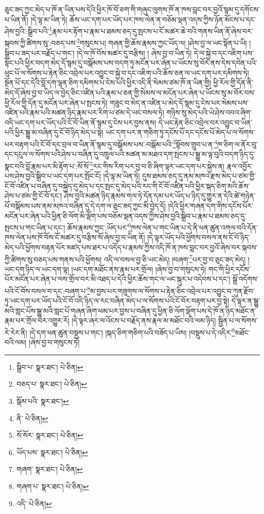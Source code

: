 ཅུང་ཟད་ཀྱང་མེད་པ་ཁོ་ན་ཡིན་པས་དེའི་ཕྱིར་ཁོ་བོ་ཅག་གི་གཞུང་ལུགས་ཁོ་ན་ཁས་བླང་བར་བྱའོ་སྙམ་དུ་དགོངས་པ་ཡིན་ནོ། །དེ་ལྟ་མ་ཡིན་ཏེ། ཆོས་ཡང་དག་པར་ཡོད་པར་ཁས་ལེན་ན་བཅོམ་ལྡན་འདས་ཀྱིས་ཉོན་མོངས་པ་དང་ཤེས་བྱའི་:སྒྲིབ་པའི་\footnote{སྒྲིབ་པ་  སྣར་ཐང་།  པེ་ཅིན། }རྣམ་པར་རྟོག་པ་རྣམ་པ་ཐམས་ཅད་དུ་སྤངས་པ་ངོ་མཚར་ཆེ་བའི་གནས་ཡིན་ནོ་ཞེས་བར་སྐབས་ཀྱི་ཚིགས་སུ་:བཅད་པས་\footnote{བཅད་པ་  སྣར་ཐང་།  པེ་ཅིན། }གསུངས་པ། གཞན་གྱི་ཆོས་རྣམས་ཀྱང་ཡོད་ལ། །ཤེས་བྱ་ལ་ཡང་སྟོན་པ་ཡི། །སྒྲིབ་པ་ཟད་པར་བརྗོད་པ་གང་། །དེ་ལ་ཁོ་བོས་མཚར་དུ་བརྩིས། །
ཞེས་བྱ་བ་ཡིན་ཏེ། དེ་ལ་སྐྱེ་བ་དང་འཇིག་པས་སྟོང་པའི་ཕྱིར་བདག་མེད་དོ་སྙམ་དུ་བསྒོམས་པས་བདག་ཏུ་མངོན་པར་ཞེན་པ་ཡོངས་སུ་བོར་ནས་དེས་དབེན་པའི་ཕུང་པོ་ལ་སོགས་པ་རྟེན་ཅིང་འབྲེལ་པར་འབྱུང་བ་སྐྱེ་བ་དང་འཇིག་པའི་ཆོས་ཅན་ལ་ཡང་དག་པར་དམིགས་ཏེ། སྔོན་པོ་དང་དེའི་བློ་དག་ལྷན་ཅིག་དམིགས་པ་ངེས་པའི་ཕྱིར་འདི་ནི་སེམས་ཙམ་ཁོ་ན་ཡིན་གྱི། ཕྱི་རོལ་གྱི་དོན་ནི་མེད་དོ་ཞེས་བྱ་བ་ཡིད་ལ་བྱེད་ཅིང་འཛིན་པའི་རྣམ་པ་ཅན་གྱི་སེམས་ལ་མངོན་པར་ཞེན་པ་ཡོངས་སུ་མ་བོར་བས་ཕྱི་རོལ་གྱི་དོན་དུ་མངོན་པར་ཞེན་པ་སྤངས་ཏེ། གཟུང་བ་མེད་ན་འཛིན་པ་མེད་དོ་སྙམ་དུ་ངེས་པར་སེམས་པས་འཛིན་པའི་རྣམ་པའི་མཚན་ཉིད་རྣམ་པར་རིག་པ་ཙམ་དེ་ཡང་བསལ་ཏེ། གཉིས་སུ་མེད་པའི་ཡེ་ཤེས་འབའ་ཞིག་འདི་ཡང་དག་པར་ཡོད་པའི་ངོ་བོ་ཡིན་ནོ་སྙམ་དུ་ངེས་པར་བྱས་ནས། དེ་ཡང་རྟེན་ཅིང་འབྲེལ་བར་འབྱུང་བ་ཡིན་པའི་ཕྱིར་སྒྱུ་མ་བཞིན་དུ་ངོ་བོ་ཉིད་མེད་པ་སྟེ། ཡང་དག་པར་ན་གཅིག་ཏུ་དངོས་པོ་དང་དངོས་པོ་མེད་པ་ལ་སོགས་པར་བརྟག་པའི་ངོ་བོ་དང་བྲལ་བ་ཡིན་ནོ་སྙམ་དུ་བསྒོམས་པས་:བསྒོམ་པའི་\footnote{སྒོམ་པའི་  སྣར་ཐང་། }སྟོབས་གྲུབ་པ་ན་\footnote{ནི་  པེ་ཅིན། }ཁ་ཅིག་ལ་ནོར་བུ་དང་དངུལ་ལ་སོགས་པའི་ཤེས་པ་བཞིན་དུ་འཁྲུལ་པའི་མཚན་མ་མཐའ་དག་སྤངས་པ་སྒྱུ་མ་ལྟ་བུའི་བདག་ཉིད་དུ་སྣང་བའི་བློ་རྣམ་པར་མི་རྟོག་པ་:སོ་སོ་\footnote{སོ་སོར་  སྣར་ཐང་།  པེ་ཅིན། }རང་གིས་རིག་པར་བྱ་བ་ཅི་ཞིག་ལྟར་ཡང་དག་པར་སྐྱེས་ན། རྣལ་འབྱོར་པས་ཤེས་བྱའི་སྒྲིབ་པ་ཡང་དག་པར་སྤོང་ངོ། །དེ་ལྟ་མ་ཡིན་ཏེ། དུས་ཐམས་ཅད་དུ་ནམ་མཁའ་རྫས་མེད་པ་ཙམ་གྱི་ངོ་བོ་འཛིན་པ་བཞིན་དུ་བསྐྱེད་དུ་མེད་པ་དང་སྤང་དུ་མེད་པའི་རང་གི་ངོ་བོ་འཛིན་པའི་ཕྱིར་སྐད་ཅིག་མའི་ཆོས་ཤེས་པ་ཙམ་གྱི་ངོ་བོ་དང་། ཤེས་བྱའི་མཚན་ཉིད་རྣམས་གལ་ཏེ་དོན་དམ་པར་ཡོད་པ་ཉིད་དུ་གྱུར་ན་དེའི་ཚེ་གཉེན་པོ་བསྒོམས་པས་ནམ་མཁའ་བཞིན་དུ་དེ་དག་ལ་ཅུང་ཟད་ཀྱང་མི་བྱེད་དོ། །དེའི་ཕྱིར་གཞན་དག་གིས་དངོས་པོར་མངོན་པར་ཞེན་པའི་ཕྱིན་ཅི་ལོག་མི་ལྡོག་པས་བཅོམ་ལྡན་འདས་ཀྱིས་ཤེས་བྱའི་སྒྲིབ་པ་རྣམ་པ་ཐམས་ཅད་དུ་སྤངས་པ་གང་ཡིན་པ་དང་། ཆོས་རྣམས་ཀྱང་:ཡོད་པར་\footnote{ཡོད་པས་  སྣར་ཐང་།  པེ་ཅིན། }ཁས་ལེན་པ་གང་ཡིན་པ་དེ་ནི་ཕན་ཚུན་འགལ་བའི་དོན་ཁས་ལེན་པས་ཁོ་བོས་ངོ་མཚར་དུ་བརྩིས་སོ་ཞེས་བྱ་བ་ཡིན་ནོ། །དེ་ལྟར་ཡོད་པའི་ཕྱོགས་བསལ་ནས་ངོ་བོ་ཉིད་མེད་པའི་ཕྱོགས་བརྟན་པོར་མཛད་པས་ཐར་པ་འདོད་པ་རྣམས་ཀྱིས་འདི་ཁོ་ན་ཁས་བླང་བར་བྱའོ་ཞེས་བར་སྐབས་ཀྱི་ཚིགས་སུ་བཅད་པས་གནས་པའི་ཕྱོགས། འདི་ལ་བསལ་བྱ་ཅི་ཡང་མེད། །བཞག་\footnote{གཞག་  སྣར་ཐང་།  པེ་ཅིན། }པར་བྱ་བ་ཅུང་ཟད་མེད། །ཡང་དག་ཉིད་ལ་ཡང་དག་ལྟ། །ཡང་དག་མཐོང་ནས་རྣམ་པར་གྲོལ། །ཞེས་བྱ་བ་གསུངས་ཏེ། གང་གི་ཕྱིར་དངོས་པོར་མངོན་པར་ཞེན་པ་ལས་གྲོལ་བར་མི་འཐད་པ་དེའི་ཕྱིར་ཆོས་གང་ལ་ཡང་སྐུར་པ་འདེབས་པ་དང་། སྒྲོ་འདོགས་པའི་ངོ་བོས་བསལ་བ་དང་:བཞག་པ་\footnote{གཞག་པ་  སྣར་ཐང་།  པེ་ཅིན། }མ་བྱས་པར་གཟུགས་ལ་སོགས་པ་རྟེན་ཅིང་འབྲེལ་པར་འབྱུང་བ་ཀུན་རྫོབ་ཏུ་ཡང་དག་པར་ཡོད་པའི་ངོ་བོ་འདི་ཉིད་ལ་རང་བཞིན་མེད་པ་ལ་སོགས་པའི་ངོ་བོར་བརྟག་པར་བྱ་སྟེ། དེ་ལྟར་ན་སྒྱུ་མའི་གླང་པོས་སྒྱུ་མའི་གླང་པོ་གཞན་ཞིག་ཕམ་པར་བྱས་པ་བཞིན་དུ་ཕྱིན་ཅི་ལོག་ལྡོག་པས་དེ་ཁོ་ན་ཉིད་མཐོང་ན་རྣམ་པར་གྲོལ་བར་འགྱུར་རོ། །དེ་ལྟར་ཞར་ལ་འོངས་པ་བརྗོད་ནས་རྣལ་མ་མཐོང་བའི་ལམ་ཉིད། སྦྱིན་པ་ལ་སོགས་རེ་རེར་ནི། །དེ་དག་ཕན་ཚུན་བསྡུས་པ་གང་། །སྐད་ཅིག་གཅིག་པའི་བཟོད་པ་ཡིས། །བསྡུས་པ་དེ་འདིར་\footnote{འདི་  པེ་ཅིན། }མཐོང་བའི་ལམ། །ཞེས་བྱ་བ་གསུངས་ཏེ། 